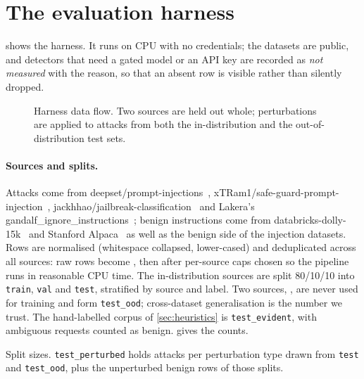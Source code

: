 \documentclass[10pt,a4paper]{article}
\begin{document}
\section{The evaluation harness}
\label{sec:harness}

 shows the harness. It runs on CPU with no credentials; the datasets are public, and detectors that need a gated model or an API key are recorded as \emph{not measured} with the reason, so that an absent row is visible rather than silently dropped.

\begin{figure}[t]
\centering
\begin{adjustbox}{max width=\linewidth}

\end{adjustbox}
\caption{Harness data flow. Two sources are held out whole; perturbations are applied to attacks from both the in-distribution and the out-of-distribution test sets.}
\label{fig:harness}
\end{figure}

\paragraph{Sources and splits.} Attacks come from deepset/prompt-injections~\cite{deepset2023injections}, xTRam1/safe-guard-prompt-injection~\cite{xtram2024safeguard}, jackhhao/jailbreak-classification~\cite{jackhhao2023jailbreak} and Lakera's gandalf\_ignore\_instructions~\cite{lakera2023gandalf}; benign instructions come from databricks-dolly-15k~\cite{databricks2023dolly} and Stanford Alpaca~\cite{taori2023alpaca} as well as the benign side of the injection datasets. Rows are normalised (whitespace collapsed, lower-cased) and deduplicated across all sources: \nraw{} raw rows become \ndedupe{}, then \ncaps{} after per-source caps chosen so the pipeline runs in reasonable CPU time. The in-distribution sources are split 80/10/10 into \texttt{train}, \texttt{val} and \texttt{test}, stratified by source and label. Two sources, \oodsources, are never used for training and form \texttt{test\_ood}; cross-dataset generalisation is the number we trust. The hand-labelled corpus of \cref{sec:heuristics} is \texttt{test\_evident}, with ambiguous requests counted as benign.  gives the counts.

\begin{table}[t]
\centering\small

\caption{Split sizes. \texttt{test\_perturbed} holds \nperturbtype{} attacks per perturbation type drawn from \texttt{test} and \texttt{test\_ood}, plus the unperturbed benign rows of those splits.}
\label{tab:manifest}
\end{table}
\end{document}

